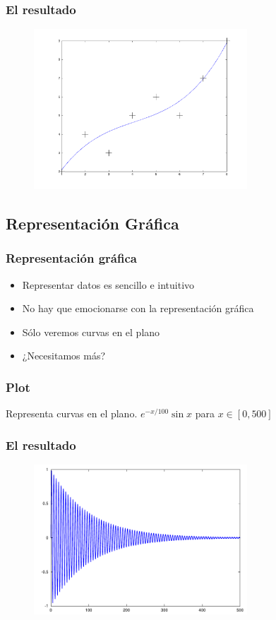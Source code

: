 \documentclass[12pt]{beamer}
\begin{document}
\begin{frame}
\frametitle{El resultado}
  \begin{figure}[h]
    \centering{}
    \includegraphics[width=8cm, keepaspectratio]{fig/polyfit.pdf}
  \end{figure}
\end{frame}

\subsection{Representación Gráfica}


\begin{frame}
\frametitle{Representación gráfica}
\begin{itemize}
\item Representar datos es sencillo e intuitivo
\item No hay que emocionarse con la representación gráfica
\item Sólo veremos curvas en el plano
\item ¿Necesitamos más?
\end{itemize}
\end{frame}


\begin{frame}
\frametitle{Plot}
Representa curvas en el plano. $e^{-x/100}\sin x$ para $x\in[0,500]$
\testcode
\end{frame}

\begin{frame}
\frametitle{El resultado}
  \begin{figure}[h]
    \centering{}
    \includegraphics[width=8cm, keepaspectratio]{fig/abanico.pdf}
  \end{figure}
\end{frame}
\end{document}
